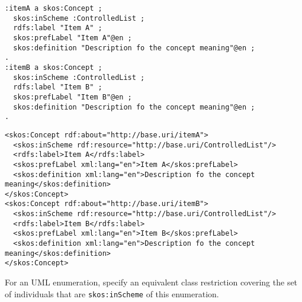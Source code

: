 \vspace{-\parskip}
\begin{minipage}[b]{.394\textwidth}
\begin{lstlisting}[language=Turtle, caption={Concept instantiation in Turtle syntax}, captionpos=b]
:itemA a skos:Concept ;
  skos:inScheme :ControlledList ;
  rdfs:label "Item A" ;
  skos:prefLabel "Item A"@en ;
  skos:definition "Description fo the concept meaning"@en ;
.
:itemB a skos:Concept ;
  skos:inScheme :ControlledList ;
  rdfs:label "Item B" ;
  skos:prefLabel "Item B"@en ;
  skos:definition "Description fo the concept meaning"@en ;
.
\end{lstlisting}
\end{minipage}%
\quad\vspace{-\parskip}
\begin{minipage}[b]{.62\textwidth}
\begin{lstlisting}[language=RDF/XML, caption={Concept instantiation in RDF/XML syntax}, captionpos=b]
<skos:Concept rdf:about="http://base.uri/itemA">
  <skos:inScheme rdf:resource="http://base.uri/ControlledList"/>
  <rdfs:label>Item A</rdfs:label>
  <skos:prefLabel xml:lang="en">Item A</skos:prefLabel>
  <skos:definition xml:lang="en">Description fo the concept meaning</skos:definition>
</skos:Concept>
<skos:Concept rdf:about="http://base.uri/itemB">
  <skos:inScheme rdf:resource="http://base.uri/ControlledList"/>
  <rdfs:label>Item B</rdfs:label>
  <skos:prefLabel xml:lang="en">Item B</skos:prefLabel>
  <skos:definition xml:lang="en">Description fo the concept meaning</skos:definition>
</skos:Concept>
\end{lstlisting}
\end{minipage}
\vspace{-\parskip}

\begin{trule}
	\label{rule:enumeration-rc}
	For an UML enumeration,	specify an equivalent class restriction covering the set of individuals that are \texttt{skos:inScheme} of this enumeration.
\end{trule}

